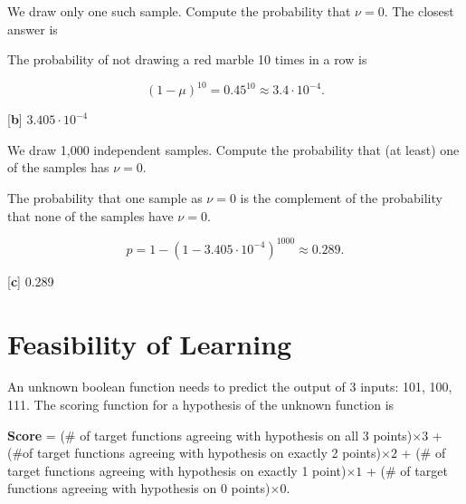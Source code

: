\documentclass[answers]{exam}
\begin{document}
\begin{questions}
\setcounter{question}{3}

\question We draw only one such sample. Compute the probability that $\nu = 0$.
The closest answer is 

\begin{solution}
The probability of not drawing a red marble 10 times in a row is

\[
    (1 - \mu)^{10} = 0.45^{10} \approx 3.4 \cdot 10^{-4}
.\] 

{[\textbf{b}]} $3.405 \cdot 10^{-4}$
\end{solution}

\question We draw 1,000 independent samples. Compute the probability that (at least)
one of the samples has $\nu = 0$.

\begin{solution}
The probability that one sample as $\nu = 0$ is the complement of the
probability that none of the samples have $\nu = 0$.

\[
p = 1 - \left( 1 - 3.405 \cdot 10^{-4} \right)^{1000} \approx 0.289 
.\] 

{[\textbf{c}]} 0.289
\end{solution}
\end{questions}

\section{Feasibility of Learning}

An unknown boolean function needs to predict the output of 3 inputs:
101, 100, 111. The scoring function for a hypothesis of the unknown function is

\textbf{Score} =  (\# of target functions agreeing with hypothesis on all 3 
points)$\times 3$ + (\#of target functions agreeing with hypothesis on exactly 
2 points)$\times 2$ + (\# of target functions agreeing with hypothesis on 
exactly 1 point)$\times 1$ + (\# of target functions
agreeing with hypothesis on 0 points)$\times 0$.
\end{document}
